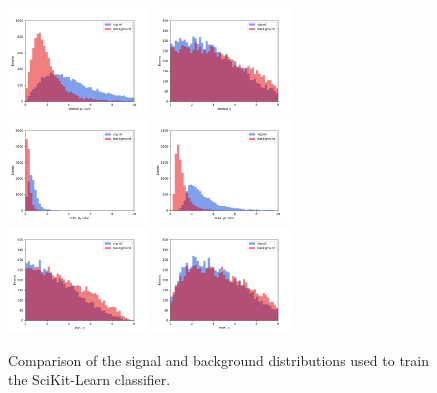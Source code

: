 \documentclass[final,5p,times,twocolumn]{elsarticle}
\begin{document}
\begin{figure}[t]
\centering
\includegraphics[width=0.33\textwidth]{pt_comp.pdf}
\includegraphics[width=0.33\textwidth]{eta_comp.pdf}
\includegraphics[width=0.33\textwidth]{minpt_comp.pdf}
\includegraphics[width=0.33\textwidth]{maxpt_comp.pdf}
\includegraphics[width=0.33\textwidth]{mineta_comp.pdf}
\includegraphics[width=0.33\textwidth]{maxeta_comp.pdf}
\caption{\small Comparison of the signal and background distributions
used to train the SciKit-Learn classifier.}
\label{fig:inputs}
\end{figure}
\end{document}
